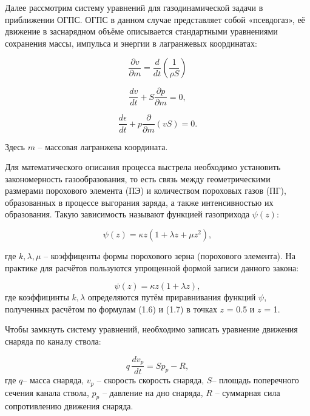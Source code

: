 \documentclass[14pt, a4paper]{extreport} %
\begin{document}
Далее рассмотрим систему уравнений для газодинамической задачи в приближении ОГПС. ОГПС в данном случае представляет собой «псевдогаз», её движение в заснарядном
объёме описывается стандартными уравнениями сохранения массы, импульса и энергии в лагранжевых координатах: 

\begin{equation}
\frac{\partial v}{\partial m} = \frac{d}{dt}\left(\frac{1}{\rho S}\right)
\end{equation}

\begin{equation}
\frac{dv}{dt} + S\frac{\partial p}{\partial m} = 0,
\end{equation}

\begin{equation}
\frac{d\epsilon}{dt} + p\frac{\partial}{\partial m}(vS) = 0.
\end{equation}

Здесь $m$ -- массовая лагранжева координата.

Для математического описания процесса выстрела необходимо установить закономерность газообразования, то есть связь между геометрическими размерами порохового элемента (ПЭ) и количеством пороховых газов (ПГ), образованных в процессе выгорания заряда, а также интенсивностью их образования. Такую зависимость называют функцией газоприхода $\psi(z)$:

\begin{equation}
\psi(z) = \kappa z (1 + \lambda z + \mu z^2),
\end{equation}

где $k, \lambda, \mu$ -- коэффиценты формы порохового зерна (порохового элемента).
На практике для расчётов пользуются упрощенной формой записи данного закона:

\begin{equation}
\psi(z) = \kappa z (1 + \lambda z),
\end{equation}
где коэффицинты $k, \lambda$ определяются путём приравнивания функций $\psi$, полученных расчётом по формулам (1.6) и (1.7) в точках $z$ = 0.5 и $z$ = 1.

Чтобы замкнуть систему уравнений, необходимо записать уравнение движения снаряда по каналу ствола:

\begin{equation}
q \, \frac{d v_{p}}{d t} = S p_{p} - R,
\end{equation}
где $q$-- масса снаряда, $v_p$ -- скорость скорость снаряда, $S$-- площадь поперечного сечения канала ствола, $ p_{p}$ -- давление на дно снаряда, $R$ -- суммарная сила сопротивлению движения снаряда. 
\end{document}

